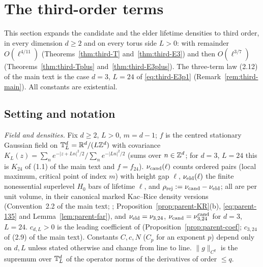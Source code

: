 \section{The third-order terms}\label{sec:third}

This section expands the candidate and the elder lifetime densities to third order, in every dimension $d\ge2$ and on every torus side $L>0$: with remainder $O(\ell^{4/11})$ (Theorems~\ref{thm:third-T} and~\ref{thm:third-E3}) and then $O(\ell^{3/7})$ (Theorems~\ref{thm:third-Tplus} and~\ref{thm:third-E3plus}). The three-term law (2.12) of the main text is the case $d=3$, $L=24$ of \eqref{eq:third-E3p1} (Remark~\ref{rem:third-main}). All constants are existential.

\subsection{Setting and notation}\label{ssec:third-setting}

\emph{Field and densities.} Fix $d\ge2$, $L>0$, $m=d-1$; $f$ is the centred stationary Gaussian field on $\mathbb T^d_L=\mathbb R^d/(L\mathbb Z^d)$ with covariance $K_L(z)=\sum_ne^{-|z+Ln|^2/2}/\sum_ne^{-|Ln|^2/2}$ (sums over $n\in\mathbb Z^d$; for $d=3$, $L=24$ this is $K_{24}$ of (1.1) of the main text and $f=f_{24}$). $\nu_{\mathrm{cand}}(\ell)$ counts ordered pairs (local maximum, critical point of index $m$) with height gap $\ell$, $\nu_{\mathrm{eld}}(\ell)$ the finite nonessential superlevel $H_0$ bars of lifetime $\ell$, and $\rho_{\mathrm{rej}}:=\nu_{\mathrm{cand}}-\nu_{\mathrm{eld}}$; all are per unit volume, in their canonical marked Kac--Rice density versions (Convention~2.2 of the main text; \cite{parentP}; Proposition~\ref{prop:parent-KR}(b), \eqref{eq:parent-135} and Lemma~\ref{lem:parent-far}), and $\nu_{\mathrm{eld}}=\nu_{3,24}$, $\nu_{\mathrm{cand}}=\nu^{\mathrm{cand}}_{3,24}$ for $d=3$, $L=24$. $c_{d,L}>0$ is the leading coefficient of \cite[(15.2)]{parentP} (Proposition~\ref{prop:parent-coef}; $c_{3,24}$ of (2.9) of the main text). Constants $C,c,N$ ($C_p$ for an exponent $p$) depend only on $d,L$ unless stated otherwise and change from line to line. $\|g\|_{C^q}$ is the supremum over $\mathbb T^d_L$ of the operator norms of the derivatives of order $\le q$.

